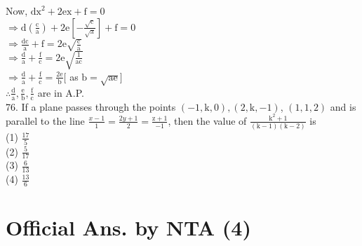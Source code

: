 \documentclass[10pt]{article}
\begin{document}
Now, \(\mathrm{dx}^{2}+2 \mathrm{ex}+\mathrm{f}=0\)\\
\(\Rightarrow \mathrm{d}\left(\frac{\mathrm{c}}{\mathrm{a}}\right)+2 \mathrm{e}\left[-\frac{\sqrt{\mathrm{c}}}{\sqrt{\mathrm{a}}}\right]+\mathrm{f}=0\)\\
\(\Rightarrow \frac{\mathrm{dc}}{\mathrm{a}}+\mathrm{f}=2 \mathrm{e} \sqrt{\frac{\mathrm{c}}{\mathrm{a}}}\)\\
\(\Rightarrow \frac{\mathrm{d}}{\mathrm{a}}+\frac{\mathrm{f}}{\mathrm{c}}=2 \mathrm{e} \sqrt{\frac{1}{\mathrm{ac}}}\)\\
\(\Rightarrow \frac{\mathrm{d}}{\mathrm{a}}+\frac{\mathrm{f}}{\mathrm{c}}=\frac{2 \mathrm{e}}{\mathrm{b}}[\) as \(\mathrm{b}=\sqrt{\mathrm{ae}}]\)\\
\(\therefore \frac{\mathrm{d}}{\mathrm{a}}, \frac{\mathrm{e}}{\mathrm{b}}, \frac{\mathrm{f}}{\mathrm{c}}\) are in A.P.\\
76. If a plane passes through the points \((-1, \mathrm{k}, 0),(2, \mathrm{k},-1)\), \((1,1,2)\) and is parallel to the line \(\frac{x-1}{1}=\frac{2 y+1}{2} =\frac{\mathrm{z}+1}{-1}\), then the value of \(\frac{\mathrm{k}^{2}+1}{(\mathrm{k}-1)(\mathrm{k}-2)}\) is\\
(1) \(\frac{17}{5}\)\\
(2) \(\frac{5}{17}\)\\
(3) \(\frac{6}{13}\)\\
(4) \(\frac{13}{6}\)

\section*{Official Ans. by NTA (4)}
\end{document}
